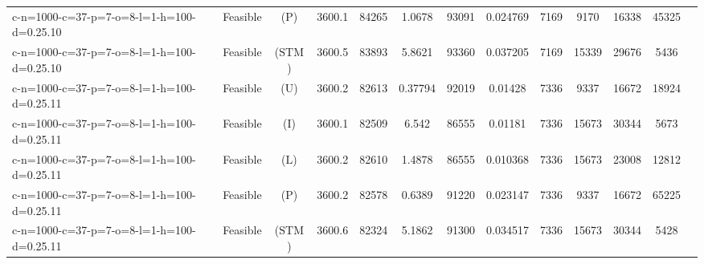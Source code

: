 \documentclass[landscape, a4paper]{article}
\newcommand{\STM}{\ensuremath{\mathrm{STM}}}
\newcommand{\Improved}{\ensuremath{\mathrm{I}}}
\newcommand{\Loose}{\ensuremath{\mathrm{L}}}
\newcommand{\Profit}{\ensuremath{\mathrm{P}}}
\newcommand{\Utility}{\ensuremath{\mathrm{U}}}
\begin{document}
\begin{center}
\begin{tabular}{lcccccccccccc}
c-n=1000-c=37-p=7-o=8-l=1-h=100-d=0.25.10 & Feasible & (\Profit) & 3600.1 & 84265 & 1.0678 & 93091 & 0.024769 & 7169 & 9170 & 16338 & 45325 & \\
c-n=1000-c=37-p=7-o=8-l=1-h=100-d=0.25.10 & Feasible & (\STM) & 3600.5 & 83893 & 5.8621 & 93360 & 0.037205 & 7169 & 15339 & 29676 & 5436 & \\
c-n=1000-c=37-p=7-o=8-l=1-h=100-d=0.25.11 & Feasible & (\Utility) & 3600.2 & 82613 & 0.37794 & 92019 & 0.01428 & 7336 & 9337 & 16672 & 18924 & \\
c-n=1000-c=37-p=7-o=8-l=1-h=100-d=0.25.11 & Feasible & (\Improved) & 3600.1 & 82509 & 6.542 & 86555 & 0.01181 & 7336 & 15673 & 30344 & 5673 & \\
c-n=1000-c=37-p=7-o=8-l=1-h=100-d=0.25.11 & Feasible & (\Loose) & 3600.2 & 82610 & 1.4878 & 86555 & 0.010368 & 7336 & 15673 & 23008 & 12812 & \\
c-n=1000-c=37-p=7-o=8-l=1-h=100-d=0.25.11 & Feasible & (\Profit) & 3600.2 & 82578 & 0.6389 & 91220 & 0.023147 & 7336 & 9337 & 16672 & 65225 & \\
c-n=1000-c=37-p=7-o=8-l=1-h=100-d=0.25.11 & Feasible & (\STM) & 3600.6 & 82324 & 5.1862 & 91300 & 0.034517 & 7336 & 15673 & 30344 & 5428 & \\
\end{tabular}
\end{center}
\end{document}
